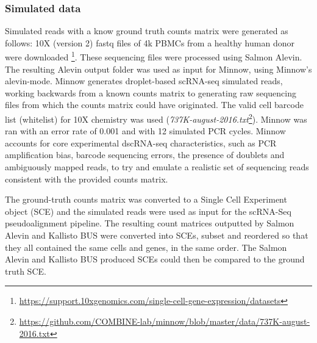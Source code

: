 \subsubsection{Simulated data}
Simulated reads with a know ground truth counts matrix were generated as follows:
10X (version 2) fastq files of 4k PBMCs from a healthy human donor were downloaded  \footnote{\url{https://support.10xgenomics.com/single-cell-gene-expression/datasets}}.
These sequencing files were processed using Salmon Alevin.
The resulting Alevin output folder was used as input for Minnow, using Minnow's alevin-mode.
Minnow generates droplet-based scRNA-seq simulated reads, working backwards from a known counts matrix to generating raw sequencing files from which the counts matrix could have originated.
The valid cell barcode list (whitelist) for 10X chemistry was used (\textit{737K-august-2016.txt}\footnote{\url{https://github.com/COMBINE-lab/minnow/blob/master/data/737K-august-2016.txt}}).
Minnow was ran with an error rate of 0.001 and with 12 simulated PCR cycles.
Minnow accounts for core experimental dscRNA-seq characteristics, such as PCR amplification bias, barcode sequencing errors, the presence of doublets and ambiguously mapped reads, to try and emulate a realistic set of sequencing reads consistent with the provided counts matrix.

The ground-truth counts matrix was converted to a Single Cell Experiment object (SCE) and the simulated reads were used as input for the scRNA-Seq pseudoalignment pipeline.
The resulting count matrices outputted by Salmon Alevin and Kallisto BUS were converted into SCEs, subset and reordered so that they all contained the same cells and genes, in the same order.
The Salmon Alevin and Kallisto BUS produced SCEs could then be compared to the ground truth SCE.


